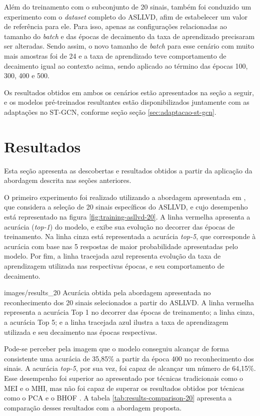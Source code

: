 
Além do treinamento com o subconjunto de 20 sinais, também foi conduzido um experimento com o \textit{dataset} completo do ASLLVD, afim de estabelecer um valor de referência para ele. Para isso, apenas as configurações relacionadas ao tamanho do \textit{batch} e das épocas de decaimento da taxa de aprendizado precisaram ser alteradas. Sendo assim, o novo tamanho de \textit{batch} para esse cenário com muito mais amostras foi de 24 e a taxa de aprendizado teve comportamento de decaimento igual ao contexto acima, sendo aplicado ao término das épocas 100, 300, 400 e 500.

Os resultados obtidos em ambos os cenários estão apresentados na seção a seguir, e os modelos pré-treinados resultantes estão disponibilizados juntamente com as adaptações no ST-GCN, conforme seção seção \ref{sec:adaptacao-st-gcn}.


\section{Resultados} %
\label{sec:resultados}

Esta seção apresenta as descobertas e resultados obtidos a partir da aplicação da abordagem descrita nas seções anteriores. 

O primeiro experimento foi realizado utilizando a abordagem apresentada em \cite{lim-2016}, que considera a seleção de 20 sinais específicos do ASLLVD, e cujo desempenho está representado na figura \ref{fig:training-asllvd-20}. A linha vermelha apresenta a acurácia (\textit{top-1}) do modelo, e exibe sua evolução no decorrer das épocas de treinamento. Na linha cinza está representada a acurácia \textit{top-5}, que corresponde à acurácia com base nas 5 respostas de maior probabilidade apresentadas pelo modelo. Por fim, a linha tracejada azul representa evolução da taxa de aprendizagem utilizada nas respectivas épocas, e seu comportamento de decaimento.

    {images/results_20}
    {Acurácia obtida pela abordagem apresentada no reconhecimento dos 20 sinais selecionados a partir do ASLLVD. A linha vermelha representa a acurácia Top 1 no decorrer das épocas de treinamento; a linha cinza, a acurácia Top 5; e a linha tracejada azul ilustra a taxa de aprendizagem utilizada e seu decaimento nas épocas respectivas.}

Pode-se perceber pela imagem que o modelo conseguiu alcançar de forma consistente uma acurácia de 35,85\% a partir da época 400 no reconhecimento dos sinais. A acurácia \textit{top-5}, por sua vez, foi capaz de alcançar um número de 64,15\%. Esse desempenho foi superior ao apresentado por técnicas tradicionais como o MEI e o MHI, mas não foi capaz de superar os resultados obtidos por técnicas como o PCA e o BHOF \cite{lim-2016}. A tabela \ref{tab:results-comparison-20} apresenta a comparação desses resultados com a abordagem proposta.

